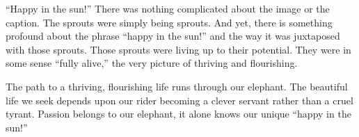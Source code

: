 \documentclass[ebook,12pt,openany,twoside]{memoir}
\begin{document}
``Happy in the sun!'' There was nothing complicated about the image or the
caption. The sprouts were simply being sprouts. And yet, there is something
profound about the phrase ``happy in the sun!'' and the way it was juxtaposed
with those sprouts. Those sprouts were living up to their potential. They were
in some sense ``fully alive,'' the very picture of thriving and flourishing.

The path to a thriving, flourishing life runs through our elephant. The
beautiful life we seek depends upon our rider becoming a clever servant rather
than a cruel tyrant. Passion belongs to our elephant, it alone knows our unique
``happy in the sun!''



\newpage
\tableofcontents
\end{document}
